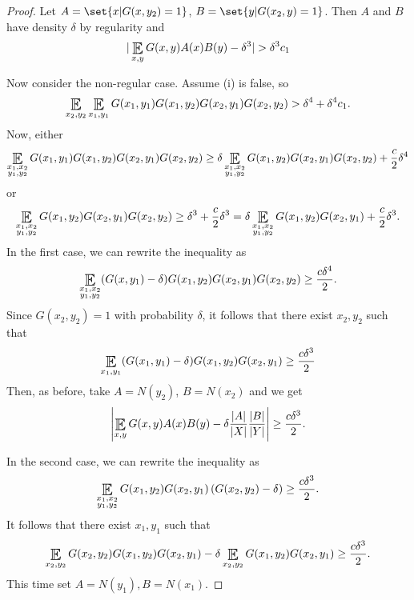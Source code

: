 \documentclass{article}
\DeclareMathOperator*{\E}{\scalerel*{\mathbb{E}}{\textstyle\sum}}
\newcommand{\1}[1]{\mathbbm{1}_{#1}}
\begin{document}
\begin{proof}
    Let $A = \set{x | G(x,y_2) = 1}$, $B = \set{y | G(x_2, y) = 1}$. Then $A$ and $B$ have density $\delta$ by regularity and
    \begin{equation*}
      |\E_{x,y} G(x,y) A(x) B(y) - \delta^3| > \delta^3 c_1
    \end{equation*}

    Now consider the non-regular case.
    Assume (i) is false, so
    \begin{equation*}
      \E_{x_2,y_2} \E_{x_1,y_1} G(x_1, y_1) G(x_1, y_2) G(x_2, y_1) G(x_2, y_2) > \delta^4+ \delta^4c_1.
    \end{equation*}
    Now, either
    \begin{equation*}
      \E_{\substack{x_1,x_2\\y_1,y_2}} G(x_1,y_1) G(x_1,y_2) G(x_2,y_1) G(x_2,y_2) \geq \delta \E_{\substack{x_1,x_2\\y_1,y_2}} G(x_1,y_2) G(x_2,y_1) G(x_2,y_2) + \frac{c}{2} \delta^4
    \end{equation*}
    or
    \begin{equation*}
      \E_{\substack{x_1,x_2\\y_1,y_2}} G(x_1,y_2) G(x_2,y_1) G(x_2,y_2) \geq \delta^3 + \frac{c}{2} \delta^3 = \delta \E_{\substack{x_1,x_2\\y_1,y_2}} G(x_1,y_2) G(x_2,y_1)  + \frac{c}{2} \delta^3.
    \end{equation*}
    In the first case, we can rewrite the inequality as
    \begin{equation*}
      \E_{\substack{x_1,x_2\\y_1,y_2}} (G(x,y_1) - \delta) G(x_1,y_2) G(x_2,y_1) G(x_2,y_2) \geq \frac{c \delta^4}{2}.
    \end{equation*}
    Since $G(x_2,y_2)=1$ with probability $\delta$, it follows that there exist $x_2,y_2$ such that
    \begin{equation*}
      \E_{x_1,y_1} (G(x_1,y_1) - \delta) G(x_1,y_2) G(x_2,y_1) \geq \frac{c \delta^3}{2}
    \end{equation*}
    Then, as before, take $A = N(y_2)$, $B = N(x_2)$ and we get
    \begin{equation*}
      \left\lvert \E_{x,y} G(x,y) A(x) B(y) - \delta \frac{|A|}{|X|} \frac{|B|}{|Y|}\right\rvert \geq \frac{c \delta^3}{2}.
    \end{equation*}

    In the second case, we can rewrite the inequality as
    \begin{equation*}
      \E_{\substack{x_1,x_2 \\y_1,y_2}} G(x_1,y_2) G(x_2,y_1) \left(G(x_2,y_2) - \delta\right) \geq \frac{c\delta^3}{2}.
    \end{equation*}
    It follows that there exist $x_1,y_1$ such that
    \begin{equation*}
      \E_{x_2,y_2} G(x_2,y_2) G(x_1,y_2) G(x_2,y_1) - \delta \E_{x_2,y_2} G(x_1,y_2) G(x_2,y_1) \geq \frac{c \delta^3}{2}.
    \end{equation*}
    This time set $A = N(y_1), B = N(x_1)$.
\end{proof}
\end{document}
